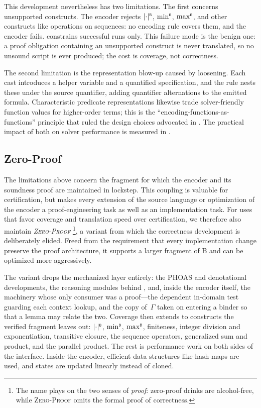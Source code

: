 This development nevertheless has two limitations.
The first concerns unsupported constructs.
The encoder rejects \(\lvert \cdot \rvert^{\scriptscriptstyle{\mathsf{B}}}\), \(\mathop{{\min}^{\scriptscriptstyle{\mathsf{B}}}}\), \(\mathop{{\max}^{\scriptscriptstyle{\mathsf{B}}}}\), and other constructs like operations on sequences: no encoding rule covers them, and the encoder fails.  constrains successful runs only.
This failure mode is the benign one: a proof obligation containing an unsupported construct is never translated, so no unsound script is ever produced; the cost is coverage, not correctness.

The second limitation is the representation blow-up caused by loosening.
Each cast introduces a helper variable and a quantified specification, and the  rule nests these under the source quantifier, adding quantifier alternations to the emitted formula.
Characteristic predicate representations likewise trade solver-friendly function values for higher-order terms; this is the ``encoding-functions-as-functions'' principle that ruled the design choices advocated in .
The practical impact of both on solver performance is measured in .

\subsection{Zero-Proof \beer{}}
\label{sec:beer-zero-proof}

The limitations above concern the fragment for which the encoder and its soundness proof are maintained in lockstep.
This coupling is valuable for certification, but makes every extension of the source language or optimization of the encoder a proof-engineering task as well as an implementation task.
For uses that favor coverage and translation speed over certification, we therefore also maintain \emph{\textsc{Zero-Proof} \beer{}}\footnote{The name plays on the two senses of \emph{proof}: zero-proof drinks are alcohol-free, while \textsc{Zero-Proof} \beer{} omits the formal proof of correctness.}, a variant from which the correctness development is deliberately elided.
Freed from the requirement that every implementation change preserve the proof architecture, it supports a larger fragment of B and can be optimized more aggressively.

The variant drops the mechanized layer entirely: the PHOAS and denotational developments, the reasoning modules behind , and, inside the encoder itself, the machinery whose only consumer was a proof---the dependent in-domain test guarding each context lookup, and the copy of~$\Gamma$ taken on entering a binder so that a lemma may relate the two.
Coverage then extends to constructs the verified fragment leaves out: \(\lvert \cdot \rvert^{\scriptscriptstyle{\mathsf{B}}}\), \(\mathop{{\min}^{\scriptscriptstyle{\mathsf{B}}}}\), \(\mathop{{\max}^{\scriptscriptstyle{\mathsf{B}}}}\), finiteness, integer division and exponentiation, transitive closure, the sequence operators, generalized sum and product, and the parallel product.
The rest is performance work on both sides of the interface.
Inside the encoder, efficient data structures like hash-maps are used, and states are updated linearly instead of cloned.

